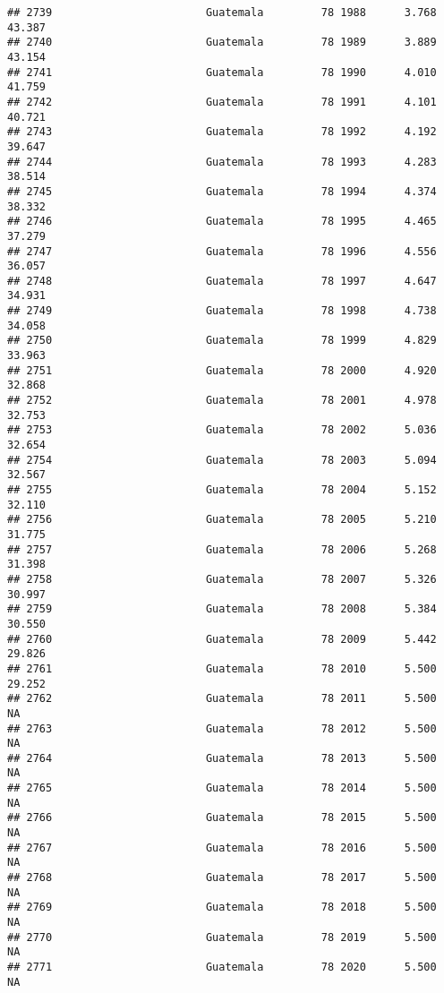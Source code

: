 \documentclass[
]{article}
\begin{document}
\begin{verbatim}
## 2739                        Guatemala         78 1988      3.768     43.387
## 2740                        Guatemala         78 1989      3.889     43.154
## 2741                        Guatemala         78 1990      4.010     41.759
## 2742                        Guatemala         78 1991      4.101     40.721
## 2743                        Guatemala         78 1992      4.192     39.647
## 2744                        Guatemala         78 1993      4.283     38.514
## 2745                        Guatemala         78 1994      4.374     38.332
## 2746                        Guatemala         78 1995      4.465     37.279
## 2747                        Guatemala         78 1996      4.556     36.057
## 2748                        Guatemala         78 1997      4.647     34.931
## 2749                        Guatemala         78 1998      4.738     34.058
## 2750                        Guatemala         78 1999      4.829     33.963
## 2751                        Guatemala         78 2000      4.920     32.868
## 2752                        Guatemala         78 2001      4.978     32.753
## 2753                        Guatemala         78 2002      5.036     32.654
## 2754                        Guatemala         78 2003      5.094     32.567
## 2755                        Guatemala         78 2004      5.152     32.110
## 2756                        Guatemala         78 2005      5.210     31.775
## 2757                        Guatemala         78 2006      5.268     31.398
## 2758                        Guatemala         78 2007      5.326     30.997
## 2759                        Guatemala         78 2008      5.384     30.550
## 2760                        Guatemala         78 2009      5.442     29.826
## 2761                        Guatemala         78 2010      5.500     29.252
## 2762                        Guatemala         78 2011      5.500         NA
## 2763                        Guatemala         78 2012      5.500         NA
## 2764                        Guatemala         78 2013      5.500         NA
## 2765                        Guatemala         78 2014      5.500         NA
## 2766                        Guatemala         78 2015      5.500         NA
## 2767                        Guatemala         78 2016      5.500         NA
## 2768                        Guatemala         78 2017      5.500         NA
## 2769                        Guatemala         78 2018      5.500         NA
## 2770                        Guatemala         78 2019      5.500         NA
## 2771                        Guatemala         78 2020      5.500         NA

\end{verbatim}
\end{document}
